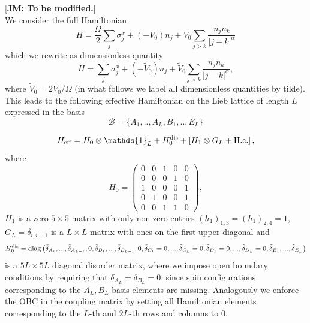 \documentclass[prl,aps,twocolumn,showpacs,superscriptaddress,longbibliography]{revtex4-1}
\begin{document}
[{\bf JM: To be modified.}] \\

We consider the full Hamiltonian
\begin{equation}
	H = \frac{\Omega}{2} \sum_j \sigma^x_j + (-V_0) n_j + V_0 \sum_{j>k} \frac{n_j n_k}{|j-k|^\alpha}
\end{equation}
which we rewrite as dimensionless quantity
\begin{equation}
	H = \sum_j \sigma^x_j + (-\tilde{V}_0) n_j + \tilde{V}_0 \sum_{j>k} \frac{n_j n_k}{|j-k|^\alpha},
\end{equation}
where $\tilde{V}_0 = 2 V_0/\Omega$ (in what follows we label all dimensionless quantities by tilde). This leads to the following effective Hamiltonian on the Lieb lattice of length $L$ expressed in the basis
\begin{equation}
	\mathcal{B}=\{A_1,..,A_L,B_1,..,E_L\}
	\label{eq:basis}
\end{equation}

\begin{equation}
	H_{\rm eff} = H_0 \otimes \mathds{1}_L + H_0^{\rm dis} + \left[ H_1 \otimes G_L + {\rm H.c.} \right],
	\label{eq:H eff}
\end{equation}
where
\begin{equation}
	H_0 =
 \begin{pmatrix}
  	 0 & 0 & 1 & 0 & 0 \\
     0 & 0 & 0 & 1 & 0 \\
     1 & 0 & 0 & 0 & 1 \\
     0 & 1 & 0 & 0 & 1 \\
     0 & 0 & 1 & 1 & 0
 \end{pmatrix},
\end{equation}
$H_1$ is a zero $5 \times 5$ matrix with only non-zero entries $(h_1)_{1,3}=(h_1)_{2,4}=1$, $G_L = \delta_{i,i+1}$ is a $L \times L$ matrix with ones on the first upper diagonal and 
\begin{equation}
	H_0^{\rm dis} = {\rm diag} \left( \tilde{\delta}_{A_1},...,\tilde{\delta}_{A_{L-1}},0,\tilde{\delta}_{B_1},...,\tilde{\delta}_{B_{L-1}},0,\tilde{\delta}_{C_1}=0,...,\tilde{\delta}_{C_{L}}=0,\tilde{\delta}_{D_1}=0,...,\tilde{\delta}_{D_{L}}=0,\tilde{\delta}_{E_1},...,\tilde{\delta}_{E_{L}}\right)
	\label{eq:disorder}
\end{equation}
is a $5L \times 5L$ diagonal disorder matrix, where we impose open boundary conditions by requiring that $\delta_{A_L} = \delta_{B_L}=0$, since spin configurations corresponding to the $A_L,B_L$ basis elements are missing. Analogously we enforce the OBC in the coupling matrix by setting all Hamiltonian elements corresponding to the $L$-th and $2L$-th rows and columns to 0. 
\end{document}
